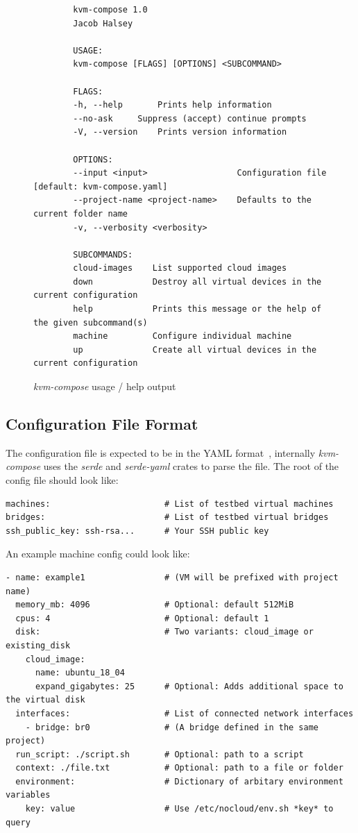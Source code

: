 \documentclass[
    author={Jacob Daniel Halsey},
    supervisor={Prof. Awais Rashid},
    degree={BSc},
    title={Building a Testbed for Evaluating Privacy Enhancing Technologies  (PETs)},
    subtitle={},
    type={software development},
    year={2021}
]{dissertation}
\begin{document}
\begin{figure}
	\begin{verbatim}
		kvm-compose 1.0
		Jacob Halsey
		
		USAGE:
		kvm-compose [FLAGS] [OPTIONS] <SUBCOMMAND>
		
		FLAGS:
		-h, --help       Prints help information
		--no-ask     Suppress (accept) continue prompts
		-V, --version    Prints version information
		
		OPTIONS:
		--input <input>                  Configuration file [default: kvm-compose.yaml]
		--project-name <project-name>    Defaults to the current folder name
		-v, --verbosity <verbosity>          
		
		SUBCOMMANDS:
		cloud-images    List supported cloud images
		down            Destroy all virtual devices in the current configuration
		help            Prints this message or the help of the given subcommand(s)
		machine         Configure individual machine
		up              Create all virtual devices in the current configuration
	\end{verbatim}
	\caption{\emph{kvm-compose} usage / help output}
	\label{fig:kvm_compose_usage}
\end{figure}

\subsection{Configuration File Format}

The configuration file is expected to be in the YAML format~\cite{yaml}, internally \emph{kvm-compose}
uses the \emph{serde} and \emph{serde-yaml} crates to parse the file.
The root of the config file should look like:

\begin{verbatim}
machines:                       # List of testbed virtual machines
bridges:                        # List of testbed virtual bridges
ssh_public_key: ssh-rsa...      # Your SSH public key
\end{verbatim}

An example machine config could look like:

\begin{verbatim}
- name: example1                # (VM will be prefixed with project name)
  memory_mb: 4096               # Optional: default 512MiB
  cpus: 4                       # Optional: default 1
  disk:                         # Two variants: cloud_image or existing_disk 
    cloud_image:
      name: ubuntu_18_04
      expand_gigabytes: 25      # Optional: Adds additional space to the virtual disk
  interfaces:                   # List of connected network interfaces
    - bridge: br0               # (A bridge defined in the same project)
  run_script: ./script.sh       # Optional: path to a script
  context: ./file.txt           # Optional: path to a file or folder
  environment:                  # Dictionary of arbitary environment variables
    key: value                  # Use /etc/nocloud/env.sh *key* to query
\end{verbatim}
\end{document}
